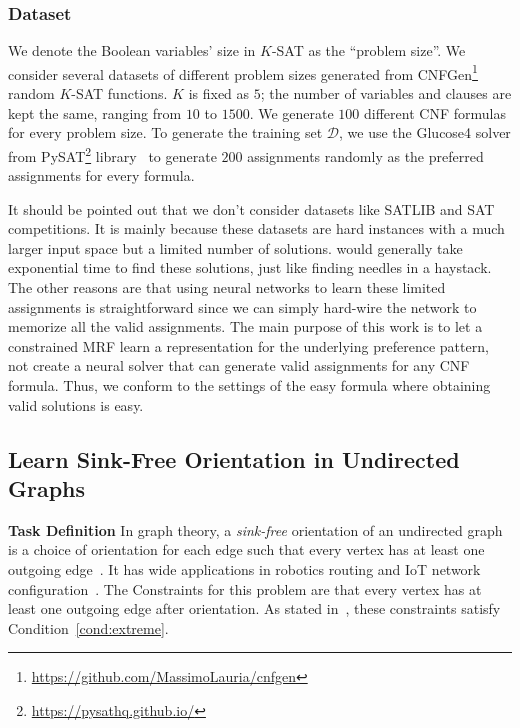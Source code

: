 

\subsubsection{Dataset} We denote the Boolean variables' size in $K$-SAT as the ``problem size''. We consider several datasets of different problem sizes generated from CNFGen\footnote{\url{https://github.com/MassimoLauria/cnfgen}}~\cite{DBLP:conf/sat/LauriaENV17} random $K$-SAT functions. $K$ is fixed as $5$; the number of variables and clauses are kept the same,  ranging from $10$ to $1500$. We generate $100$ different CNF formulas  for every problem size. To generate the training set $\mathcal{D}$, we use the Glucose4 solver from PySAT\footnote{\url{https://pysathq.github.io/}} library~\cite{DBLP:conf/sat/IgnatievMM18} to generate $200$ assignments randomly as the preferred assignments for every formula. 

It should be pointed out that we don't consider datasets like SATLIB and SAT competitions. It is mainly because these datasets are hard instances with a much larger input space but a limited number of solutions. \nls would generally take exponential time to find these solutions, just like finding needles in a haystack. The other reasons are that using neural networks to learn these limited assignments is straightforward since we can simply hard-wire the network to memorize all the valid assignments. The main purpose of this work is to let a constrained MRF learn a representation for the underlying preference pattern, not create a neural solver that can generate valid assignments for any CNF formula. Thus, we conform to the settings of the easy formula where obtaining valid solutions is easy.









\subsection{Learn Sink-Free Orientation in Undirected Graphs}
\textbf{Task Definition} In graph theory, a \textit{sink-free} orientation of an undirected graph is a choice of orientation for each edge such that every vertex has at least one outgoing edge~\cite{DBLP:journals/combinatorics/CohnPP02}. It has wide applications in robotics routing and IoT network configuration~\cite{takahashi2009communication}.  The Constraints for this problem are that every vertex has at least one outgoing edge after orientation. As stated in~\cite{DBLP:journals/jacm/GuoJL19}, these constraints satisfy Condition~\ref{cond:extreme}.

